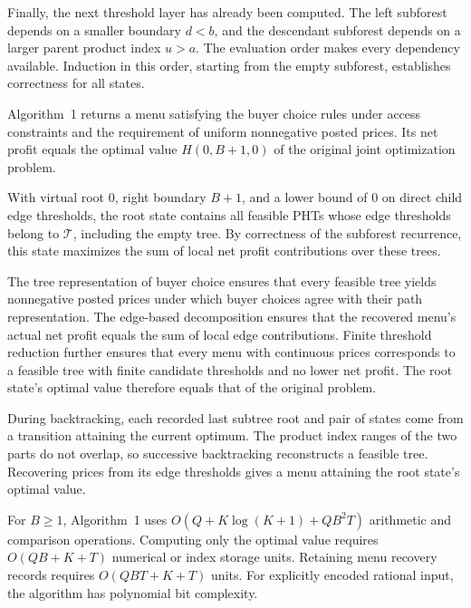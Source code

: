 \begin{IEEEproof}
Finally, the next threshold layer has already been computed. The left subforest depends on a smaller boundary $d<b$, and the descendant subforest depends on a larger parent product index $u>a$. The evaluation order makes every dependency available. Induction in this order, starting from the empty subforest, establishes correctness for all states.%
\end{IEEEproof}

\begin{theorem}\label{thm:joint}
Algorithm~1 returns a menu satisfying the buyer choice rules under access constraints and the requirement of uniform nonnegative posted prices. Its net profit equals the optimal value $H(0,B+1,0)$ of the original joint optimization problem.
\end{theorem}

\begin{IEEEproof}
With virtual root 0, right boundary $B+1$, and a lower bound of 0 on direct child edge thresholds, the root state contains all feasible PHTs whose edge thresholds belong to $\mathcal T$, including the empty tree. By correctness of the subforest recurrence, this state maximizes the sum of local net profit contributions over these trees.

The tree representation of buyer choice ensures that every feasible tree yields nonnegative posted prices under which buyer choices agree with their path representation. The edge-based decomposition ensures that the recovered menu's actual net profit equals the sum of local edge contributions. Finite threshold reduction further ensures that every menu with continuous prices corresponds to a feasible tree with finite candidate thresholds and no lower net profit. The root state's optimal value therefore equals that of the original problem.

During backtracking, each recorded last subtree root and pair of states come from a transition attaining the current optimum. The product index ranges of the two parts do not overlap, so successive backtracking reconstructs a feasible tree. Recovering prices from its edge thresholds gives a menu attaining the root state's optimal value.%
\end{IEEEproof}

\begin{theorem}\label{thm:complexity}
For $B\ge1$, Algorithm~1 uses $O(Q+K\log(K+1)+QB^2T)$ arithmetic and comparison operations. Computing only the optimal value requires $O(QB+K+T)$ numerical or index storage units. Retaining menu recovery records requires $O(QBT+K+T)$ units. For explicitly encoded rational input, the algorithm has polynomial bit complexity.
\end{theorem}

